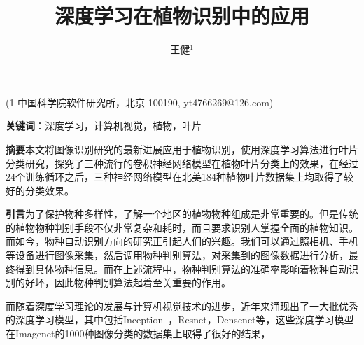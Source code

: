 \documentclass[a4paper]{ctexart} %
\title{深度学习在植物识别中的应用}
\author{王健$^1$}
\begin{document}
	\maketitle
	\begin{center}
		(1 中国科学院软件研究所，北京 100190, yt4766269@126.com)
	\end{center}
\textbf{关键词}：深度学习，计算机视觉，植物，叶片

\textbf{摘要}\quad 本文将图像识别研究的最新进展应用于植物识别，使用深度学习算法进行叶片分类研究，探究了三种流行的卷积神经网络模型在植物叶片分类上的效果，在经过24个训练循环之后，三种神经网络模型在北美184种植物叶片数据集上均取得了较好的分类效果。

\textbf{引言}\quad 为了保护物种多样性，了解一个地区的植物物种组成是非常重要的。但是传统的植物物种判别手段不仅非常复杂和耗时，而且要求识别人掌握全面的植物知识。而如今，物种自动识别方向的研究正引起人们的兴趣。我们可以通过照相机、手机等设备进行图像采集，然后调用物种判别算法，对采集到的图像数据进行分析，最终得到具体物种信息。而在上述流程中，物种判别算法的准确率影响着物种自动识别的好坏，因此物种判别算法起着至关重要的作用。

而随着深度学习理论的发展与计算机视觉技术的进步，近年来涌现出了一大批优秀的深度学习模型，其中包括Inception~\parencite{A01}，Resnet，Densenet等，这些深度学习模型在Imagenet的1000种图像分类的数据集上取得了很好的结果，

\printbibliography
\end{document}
